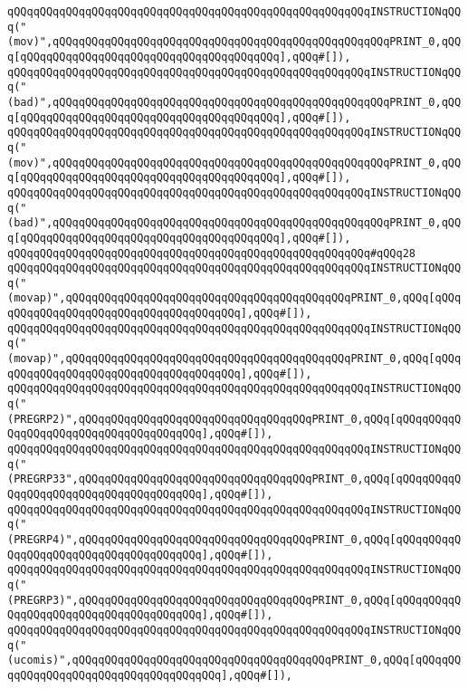 \verb|qQQqqQQqqQQqqQQqqQQqqQQqqQQqqQQqqQQqqQQqqQQqqQQqqQQqqQQqINSTRUCTIONqQQq("(mov)",qQQqqQQqqQQqqQQqqQQqqQQqqQQqqQQqqQQqqQQqqQQqqQQqqQQqPRINT_0,qQQq[qQQqqQQqqQQqqQQqqQQqqQQqqQQqqQQqqQQqqQQq],qQQq#[]),|\newline
\verb|qQQqqQQqqQQqqQQqqQQqqQQqqQQqqQQqqQQqqQQqqQQqqQQqqQQqqQQqINSTRUCTIONqQQq("(bad)",qQQqqQQqqQQqqQQqqQQqqQQqqQQqqQQqqQQqqQQqqQQqqQQqqQQqPRINT_0,qQQq[qQQqqQQqqQQqqQQqqQQqqQQqqQQqqQQqqQQqqQQq],qQQq#[]),|\newline
\verb|qQQqqQQqqQQqqQQqqQQqqQQqqQQqqQQqqQQqqQQqqQQqqQQqqQQqqQQqINSTRUCTIONqQQq("(mov)",qQQqqQQqqQQqqQQqqQQqqQQqqQQqqQQqqQQqqQQqqQQqqQQqqQQqPRINT_0,qQQq[qQQqqQQqqQQqqQQqqQQqqQQqqQQqqQQqqQQqqQQq],qQQq#[]),|\newline
\verb|qQQqqQQqqQQqqQQqqQQqqQQqqQQqqQQqqQQqqQQqqQQqqQQqqQQqqQQqINSTRUCTIONqQQq("(bad)",qQQqqQQqqQQqqQQqqQQqqQQqqQQqqQQqqQQqqQQqqQQqqQQqqQQqPRINT_0,qQQq[qQQqqQQqqQQqqQQqqQQqqQQqqQQqqQQqqQQqqQQq],qQQq#[]),|\newline
\verb|qQQqqQQqqQQqqQQqqQQqqQQqqQQqqQQqqQQqqQQqqQQqqQQqqQQqqQQq#qQQq28|\newline
\verb|qQQqqQQqqQQqqQQqqQQqqQQqqQQqqQQqqQQqqQQqqQQqqQQqqQQqqQQqINSTRUCTIONqQQq("(movap)",qQQqqQQqqQQqqQQqqQQqqQQqqQQqqQQqqQQqqQQqqQQqPRINT_0,qQQq[qQQqqQQqqQQqqQQqqQQqqQQqqQQqqQQqqQQqqQQq],qQQq#[]),|\newline
\verb|qQQqqQQqqQQqqQQqqQQqqQQqqQQqqQQqqQQqqQQqqQQqqQQqqQQqqQQqINSTRUCTIONqQQq("(movap)",qQQqqQQqqQQqqQQqqQQqqQQqqQQqqQQqqQQqqQQqqQQqPRINT_0,qQQq[qQQqqQQqqQQqqQQqqQQqqQQqqQQqqQQqqQQqqQQq],qQQq#[]),|\newline
\verb|qQQqqQQqqQQqqQQqqQQqqQQqqQQqqQQqqQQqqQQqqQQqqQQqqQQqqQQqINSTRUCTIONqQQq("(PREGRP2)",qQQqqQQqqQQqqQQqqQQqqQQqqQQqqQQqqQQqPRINT_0,qQQq[qQQqqQQqqQQqqQQqqQQqqQQqqQQqqQQqqQQqqQQq],qQQq#[]),|\newline
\verb|qQQqqQQqqQQqqQQqqQQqqQQqqQQqqQQqqQQqqQQqqQQqqQQqqQQqqQQqINSTRUCTIONqQQq("(PREGRP33",qQQqqQQqqQQqqQQqqQQqqQQqqQQqqQQqqQQqPRINT_0,qQQq[qQQqqQQqqQQqqQQqqQQqqQQqqQQqqQQqqQQqqQQq],qQQq#[]),|\newline
\verb|qQQqqQQqqQQqqQQqqQQqqQQqqQQqqQQqqQQqqQQqqQQqqQQqqQQqqQQqINSTRUCTIONqQQq("(PREGRP4)",qQQqqQQqqQQqqQQqqQQqqQQqqQQqqQQqqQQqPRINT_0,qQQq[qQQqqQQqqQQqqQQqqQQqqQQqqQQqqQQqqQQqqQQq],qQQq#[]),|\newline
\verb|qQQqqQQqqQQqqQQqqQQqqQQqqQQqqQQqqQQqqQQqqQQqqQQqqQQqqQQqINSTRUCTIONqQQq("(PREGRP3)",qQQqqQQqqQQqqQQqqQQqqQQqqQQqqQQqqQQqPRINT_0,qQQq[qQQqqQQqqQQqqQQqqQQqqQQqqQQqqQQqqQQqqQQq],qQQq#[]),|\newline
\verb|qQQqqQQqqQQqqQQqqQQqqQQqqQQqqQQqqQQqqQQqqQQqqQQqqQQqqQQqINSTRUCTIONqQQq("(ucomis)",qQQqqQQqqQQqqQQqqQQqqQQqqQQqqQQqqQQqqQQqPRINT_0,qQQq[qQQqqQQqqQQqqQQqqQQqqQQqqQQqqQQqqQQqqQQq],qQQq#[]),|\newline
